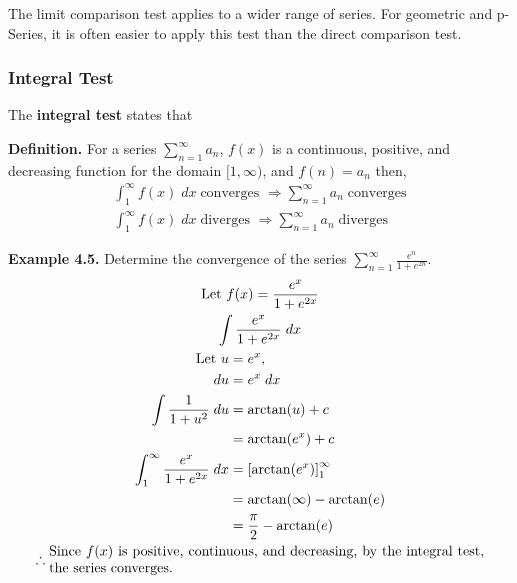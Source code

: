 \documentclass[12pt]{article}
\begin{document}
The limit comparison test applies to a wider range of series. For geometric and p-Series, it is often easier to apply this test than the direct comparison test.

\subsubsection{Integral Test}

The \textbf{integral test} states that

\textbf{Definition.} For a series $\displaystyle\sum_{n=1}^{\infty}a_n$, $f(x)$ is a continuous, positive, and decreasing function for the domain $[1, \infty)$, and $f(n) = a_n$ then,
\begin{gather*}
	\displaystyle\int_{1}^{\infty}f(x)\;dx \; \text{converges } \Rightarrow \displaystyle\sum_{n=1}^{\infty}a_n \; \text{converges} \\
	\displaystyle\int_{1}^{\infty}f(x)\;dx \; \text{diverges } \Rightarrow \displaystyle\sum_{n=1}^{\infty}a_n \; \text{diverges}
\end{gather*}

\textbf{Example 4.5.} Determine the convergence of the series $\displaystyle\sum_{n=1}^{\infty}\frac{e^n}{1+e^{2n}}$.
\begin{gather*}
	\text{Let } f(x) = \frac{e^x}{1+e^{2x}}  \\
	\displaystyle\int\frac{e^x}{1+e^{2x}}\;dx \\
	\begin{aligned}
		\text{Let } u                                          & = e^{x},                               \\
		du                                                     & = e^{x} \;dx                           \\
		\displaystyle\int\frac{1}{1+u^2}\;du                   & = \arctan(u) + c                       \\
		                                                       & = \arctan(e^x) + c                     \\
		\displaystyle\int_{1}^{\infty}\frac{e^x}{1+e^{2x}}\;dx & = \left[\arctan(e^x)\right]_1^{\infty} \\
		                                                       & = \arctan(\infty) - \arctan(e)         \\
		                                                       & = \frac{\pi}{2} - \arctan(e)
	\end{aligned} \\
	\therefore \parbox{0.9\linewidth}{
		Since \( f(x) \) is positive, continuous, and decreasing, by the integral test, the series converges.}
\end{gather*}
\end{document}
